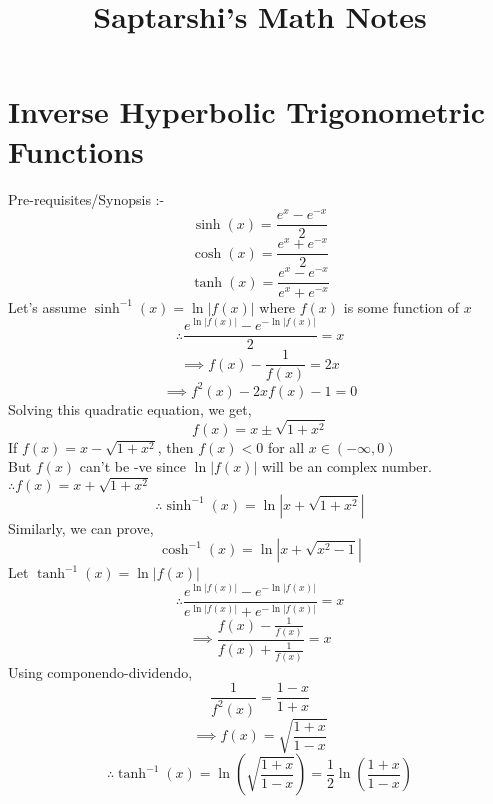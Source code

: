 \documentclass[14pt]{article}
\begin{document}
	\title{Saptarshi's Math Notes}
	\maketitle
	\section{Inverse Hyperbolic Trigonometric Functions}
	\large{Pre-requisites/Synopsis :-}
	\begin{equation}
		\sinh(x)=\frac{e^x-e^{-x}}{2}
	\end{equation}
	\begin{equation}
		\cosh(x)=\frac{e^x+e^{-x}}{2}
	\end{equation}
	\begin{equation}
		\tanh(x)=\frac{e^x-e^{-x}}{e^x+e^{-x}}
	\end{equation}
	Let's assume $\sinh^{-1}(x)=\ln|f(x)|$ where $f(x)$ is some function of $x$ 
	\\ \begin{equation*}
	\therefore \frac{e^{\ln|f(x)|}-e^{-\ln|f(x)|}}{2} = x	
	\end{equation*}
	\begin{equation*}					%
	\implies f(x)-\frac{1}{f(x)} = 2x		
	\end{equation*}
	\begin{equation*}
	\implies f^2(x)-2xf(x)-1 = 0		
	\end{equation*}
	Solving this quadratic equation, we get,
	\begin{equation*}
		f(x)=x\pm\sqrt{1+x^2}
	\end{equation*}
	If $f(x)=x-\sqrt{1+x^2}$, then $f(x)<0$ for all $x\in(-\infty,0)$
	\\ But $f(x)$ can't be -ve since $\ln|f(x)|$ will be an complex number.
	$\therefore f(x)=x+\sqrt{1+x^2}$
	\begin{equation}
		\therefore \boxed{\sinh^{-1}(x)=\ln|x+\sqrt{1+x^2}|}
	\end{equation}
	Similarly, we can prove,
	\begin{equation}
	\boxed{\cosh^{-1}(x)=\ln|x+\sqrt{x^2-1}|}
	\end{equation}
	Let $\tanh^{-1}(x)=\ln|f(x)|$
	\begin{equation*}
		\therefore \frac{e^{\ln|f(x)|}-e^{-\ln|f(x)|}}{e^{\ln|f(x)|}+e^{-\ln|f(x)|}}=x
	\end{equation*}
	\begin{equation*}
	\implies \frac{f(x)-\frac{1}{f(x)}}{f(x)+\frac{1}{f(x)}}=x
	\end{equation*}
	Using componendo-dividendo,
	\begin{equation*}
	\frac{1}{f^2(x)}=\frac{1-x}{1+x}
	\end{equation*}
	\begin{equation*}
	\implies f(x)=\sqrt{\frac{1+x}{1-x}}
	\end{equation*}
	\begin{equation}
	\therefore \boxed{\tanh^{-1}(x)=\ln(\sqrt{\frac{1+x}{1-x}})=\frac{1}{2}\ln(\frac{1+x}{1-x})}
	\end{equation}
\end{document}
